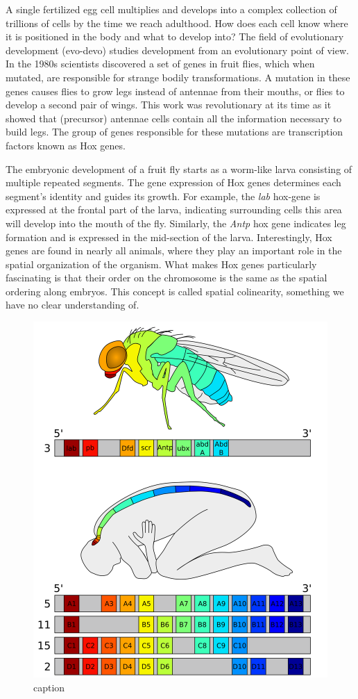 A single fertilized egg cell multiplies and develops into a complex collection of trillions of cells by the time we reach adulthood. How does each cell know where it is positioned in the body and what to develop into? The field of evolutionary development (evo-devo) studies development from an evolutionary point of view. In the 1980s scientists discovered a set of genes in fruit flies, which when mutated, are responsible for strange bodily transformations. A mutation in these genes causes flies to grow legs instead of antennae from their mouths\cite{Schneuwly1987}, or flies to develop a second pair of wings\cite{Weatherbee1998}. This work was revolutionary at its time as it showed that (precursor) antennae cells contain all the information necessary to build legs. The group of genes responsible for these mutations are transcription factors  known as Hox genes.

The embryonic development of a fruit fly starts as a worm-like larva consisting of multiple repeated segments. The gene expression of Hox genes determines each segment's identity and guides its growth. For example, the \textit{lab} hox-gene is expressed at the frontal part of the larva, indicating surrounding cells this area will develop into the mouth of the fly\cite{Hughes2002}. Similarly, the \textit{Antp} hox gene indicates leg formation and is expressed in the mid-section of the larva. Interestingly, Hox genes are found in nearly all animals, where they play an important role in the spatial organization of the organism. What makes Hox genes particularly fascinating is that their order on the chromosome is the same as the spatial ordering along embryos. This concept is called spatial colinearity, something we have no clear understanding of\cite{Gaunt2015}.

\begin{figure}[H]
    \center
    \includegraphics[width=0.5\linewidth]{ch.introduction/imgs/hox.png}
    \caption{caption}
    \label{fig:hox}
\end{figure}


